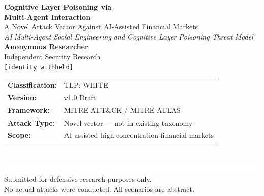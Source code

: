 \documentclass[11pt,a4paper]{article}
\begin{document}
\begin{titlepage}
\centering
\vspace*{2cm}
{\LARGE\bfseries\color{darkblue}
Cognitive Layer Poisoning via\\[0.3em]
Multi-Agent Interaction\\[0.5em]}
{\large\color{medblue}
A Novel Attack Vector Against AI-Assisted Financial Markets\\[0.3em]}
{\normalsize\itshape\color{medblue}
AI\(\;\)Multi-Agent Social Engineering and Cognitive Layer Poisoning Threat Model\\[2em]}
{\normalsize\textbf{Anonymous Researcher}\\
Independent Security Research\\[0.5em]
\texttt{[identity withheld]}\\[2em]}
{\small
\begin{tabular}{ll}
\textbf{Classification:} & TLP: WHITE \\
\textbf{Version:}        & v1.0 Draft \\
\textbf{Framework:}      & MITRE ATT\&CK / MITRE ATLAS \\
\textbf{Attack Type:}    & Novel vector --- not in existing taxonomy \\
\textbf{Scope:}          & AI-assisted high-concentration financial markets \\
\end{tabular}\\[3em]}
\rule{0.6\linewidth}{0.8pt}
\vfill
{\small\color{gray}Submitted for defensive research purposes only.\\
No actual attacks were conducted. All scenarios are abstract.}
\end{titlepage}
\end{document}

